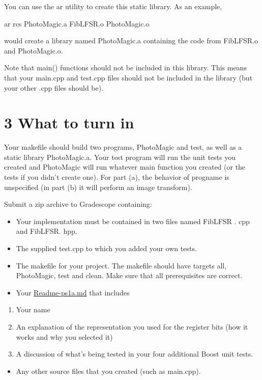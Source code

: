\documentclass[10pt]{article}
\begin{document}
You can use the ar utility to create this static library. As an example,

ar rcs PhotoMagic.a FibLFSR.o PhotoMagic.o

would create a library named PhotoMagic.a containing the code from FibLFSR.o and PhotoMagic.o.

Note that main() functions should not be included in this library. This means that your main.cpp and test.cpp files should not be included in the library (but your other .cpp files should be).

\section*{3 What to turn in}
Your makefile should build two programs, PhotoMagic and test, as well as a static library PhotoMagic.a. Your test program will run the unit tests you created and PhotoMagic will run whatever main function you created (or the tests if you didn't create one). For part (a), the behavior of progname is unspecified (in part (b) it will perform an image transform).

Submit a zip archive to Gradescope containing:

\begin{itemize}
  \item Your implementation must be contained in two files named FibLFSR . cpp and FibLFSR. hpp.
  \item The supplied test.cpp to which you added your own tests.
  \item The makefile for your project. The makefile should have targets all, PhotoMagic, test and clean. Make sure that all prerequisites are correct.
  \item Your \href{http://Readme-ps1a.md}{Readme-ps1a.md} that includes
\end{itemize}

\begin{enumerate}
  \item Your name

  \item An explanation of the representation you used for the register bits (how it works and why you selected it)

  \item A discussion of what's being tested in your four additional Boost unit tests.

\end{enumerate}

\begin{itemize}
  \item Any other source files that you created (such as main.cpp).
\end{itemize}
\end{document}
